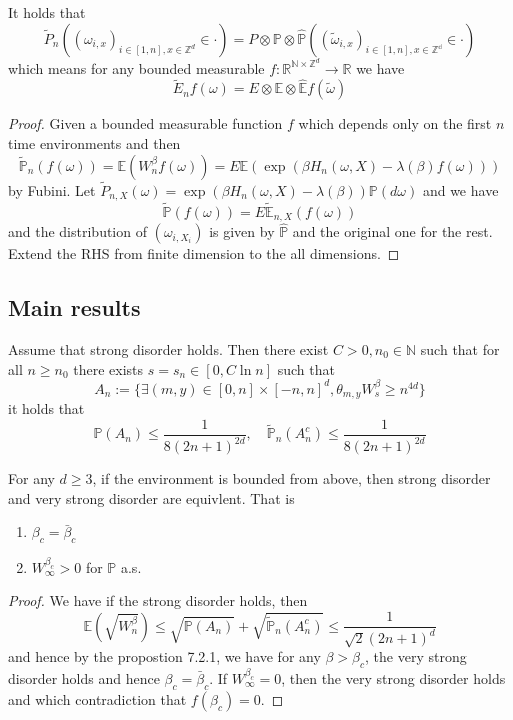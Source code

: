 \begin{lemma}
    It holds that
    \[
    \widetilde{P}_n((\omega_{i,x})_{i\in[1,n],x\in\mathbb{Z}^d}\in \cdot) = P\otimes \mathbb{P}\otimes\widehat{\mathbb{P}}((\widetilde{\omega}_{i,x})_{i\in[1,n],x\in\mathbb{Z^d}}\in \cdot)
    \]
    which means for any bounded measurable $f:\mathbb{R}^{\mathbb{N}\times \mathbb{Z}^d}\to \mathbb{R}$ we have
    \[
    \widetilde{E}_n f(\omega) = E\otimes \mathbb{E}\otimes\widehat{\mathbb{E}} f(\widetilde{\omega})
    \]
\end{lemma}
\begin{proof}
    Given a bounded measurable function $f$ which depends only on the first $n$ time environments and then
    \[
    \widetilde{\mathbb{P}}_n(f(\omega)) = \mathbb{E}(W_n^{\beta}f(\omega)) = E\mathbb{E}(\exp(\beta H_n(\omega,X) - \lambda(\beta)f(\omega)))
    \]
    by Fubini. Let $\tilde{P}_{n,X}(\omega) = \exp(\beta H_n(\omega,X) - \lambda(\beta))\mathbb{P}(d\omega)$ and we have
    \[
    \widetilde{\mathbb{P}}(f(\omega)) = E\tilde{\mathbb{E}}_{n,X}(f(\omega))
    \]
    and the distribution of $(\omega_{i,X_i})$ is given by $\hat{\mathbb{P}}$ and the original one for the rest. Extend the RHS from finite dimension to the all dimensions.
\end{proof}
\newpage
\subsection{Main results}

\begin{proposition}
    Assume that strong disorder holds. Then there exist $C>0, n_0\in\mathbb{N}$ such that for all $n\geq n_0$ there exists $s = s_n \in [0,C\ln n]$ such that
    \[
    A_n:= \{\exists (m,y)\in[0,n]\times[-n,n]^d, \theta_{m,y} W_s^{\beta} \geq n^{4d}\}
    \]
    it holds that
    \[
    \mathbb{P}(A_n) \leq \dfrac{1}{8(2n+1)^{2d}},\quad \tilde{\mathbb{P}}_n(A_n^c) \leq \dfrac{1}{8(2n+1)^{2d}}
    \]
\end{proposition}

\begin{theorem}
    For any $d\geq 3$, if the environment is bounded from above, then strong disorder and very strong disorder are equivlent. That is \begin{enumerate}
        \item $\beta_c = \bar{\beta}_c$
        \item $W_{\infty}^{\beta_c} > 0$ for $\mathbb{P}$ a.s.
    \end{enumerate}
\end{theorem}
\begin{proof}
    We have if the strong disorder holds, then
    \[
    \mathbb{E}(\sqrt{W_n^{\beta}}) \leq \sqrt{\mathbb{P}(A_n)} + \sqrt{\tilde{\mathbb{P}}_n(A_n^c)} \leq \dfrac{1}{\sqrt{2}(2n+1)^d} 
    \]
    and hence by the propostion 7.2.1, we have for any $\beta > \beta_c$, the very strong disorder holds and hence $\beta_c = \bar{\beta}_c$. If $W_{\infty}^{\beta_c} = 0$, then the very strong disorder holds and which contradiction that $f(\beta_c) = 0$.
\end{proof}


